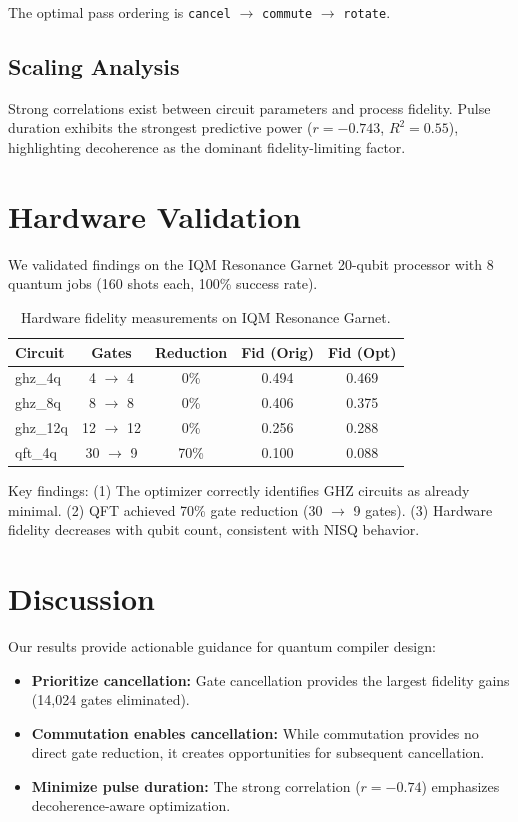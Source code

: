 \documentclass[journal]{IEEEtran}
\begin{document}
The optimal pass ordering is \texttt{cancel} $\rightarrow$ \texttt{commute} $\rightarrow$ \texttt{rotate}.

\subsection{Scaling Analysis}

Strong correlations exist between circuit parameters and process fidelity. Pulse duration exhibits the strongest predictive power ($r = -0.743$, $R^2 = 0.55$), highlighting decoherence as the dominant fidelity-limiting factor.

\section{Hardware Validation}

We validated findings on the IQM Resonance Garnet 20-qubit processor with 8 quantum jobs (160 shots each, 100\% success rate).

\begin{table}[t]
\caption{Hardware fidelity measurements on IQM Resonance Garnet.}
\label{tab:hardware}
\centering
\begin{tabular}{lcccc}
\hline
Circuit & Gates & Reduction & Fid (Orig) & Fid (Opt) \\
\hline
ghz\_4q & 4 $\rightarrow$ 4 & 0\% & 0.494 & 0.469 \\
ghz\_8q & 8 $\rightarrow$ 8 & 0\% & 0.406 & 0.375 \\
ghz\_12q & 12 $\rightarrow$ 12 & 0\% & 0.256 & 0.288 \\
qft\_4q & 30 $\rightarrow$ 9 & 70\% & 0.100 & 0.088 \\
\hline
\end{tabular}
\end{table}

Key findings: (1) The optimizer correctly identifies GHZ circuits as already minimal. (2) QFT achieved 70\% gate reduction (30 $\rightarrow$ 9 gates). (3) Hardware fidelity decreases with qubit count, consistent with NISQ behavior.

\section{Discussion}

Our results provide actionable guidance for quantum compiler design:

\begin{itemize}
    \item \textbf{Prioritize cancellation:} Gate cancellation provides the largest fidelity gains (14,024 gates eliminated).
    \item \textbf{Commutation enables cancellation:} While commutation provides no direct gate reduction, it creates opportunities for subsequent cancellation.
    \item \textbf{Minimize pulse duration:} The strong correlation ($r = -0.74$) emphasizes decoherence-aware optimization.
\end{itemize}
\end{document}
